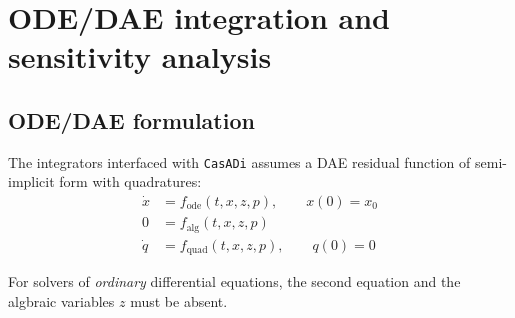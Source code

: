 \documentclass[a4paper,12pt]{book}
\newcommand{\CasADi}{\texttt{CasADi}\xspace}
\begin{document}

\chapter{ODE/DAE integration and sensitivity analysis} \label{ch:integrators}
\section{ODE/DAE formulation}
The integrators interfaced with \CasADi assumes a DAE residual function of semi-implicit form with quadratures:
\begin{subequations}
\begin{align}
 \dot{x} &= f_{\text{ode}}(t,x,z,p), \qquad x(0) = x_0 \\
      0  &= f_{\text{alg}}(t,x,z,p) \\
 \dot{q} &= f_{\text{quad}}(t,x,z,p), \qquad q(0) = 0
\end{align}
\end{subequations}

For solvers of \emph{ordinary} differential equations, the second equation and the algbraic variables $z$ must be absent.

\end{document}
